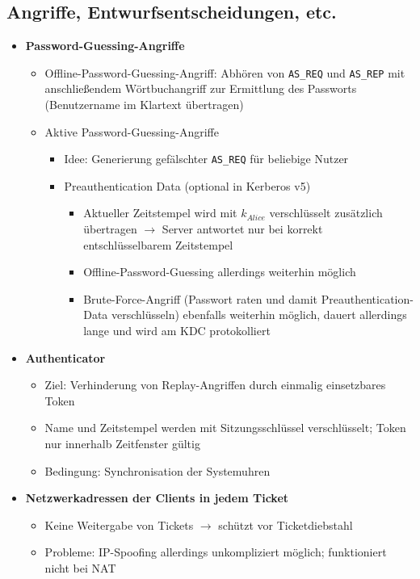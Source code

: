 \subsection{Angriffe, Entwurfsentscheidungen, etc.}
\begin{itemize}
	\item \textbf{Password-Guessing-Angriffe}
	\begin{itemize}
		\item Offline-Password-Guessing-Angriff: Abhören von \texttt{AS\_REQ} und \texttt{AS\_REP} mit anschließendem Wörtbuchangriff zur Ermittlung des Passworts (Benutzername im Klartext übertragen)
		\item Aktive Password-Guessing-Angriffe
		\begin{itemize}
			\item Idee: Generierung gefälschter \texttt{AS\_REQ} für beliebige Nutzer
			\item Preauthentication Data (optional in Kerberos v5)
			\begin{itemize}
				\item Aktueller Zeitstempel wird mit \(k_{Alice}\) verschlüsselt zusätzlich übertragen \(\rightarrow\) Server antwortet nur bei korrekt entschlüsselbarem Zeitstempel
				\item Offline-Password-Guessing allerdings weiterhin möglich
				\item Brute-Force-Angriff (Passwort raten und damit Preauthentication-Data verschlüsseln) ebenfalls weiterhin möglich, dauert allerdings lange und wird am KDC protokolliert
			\end{itemize}
		\end{itemize}
	\end{itemize}
	\item \textbf{Authenticator}
	\begin{itemize}
		\item Ziel: Verhinderung von Replay-Angriffen durch einmalig einsetzbares Token
		\item Name und Zeitstempel werden mit Sitzungsschlüssel verschlüsselt; Token nur innerhalb Zeitfenster gültig
		\item Bedingung: Synchronisation der Systemuhren
	\end{itemize}
	\item \textbf{Netzwerkadressen der Clients in jedem Ticket}
	\begin{itemize}
		\item Keine Weitergabe von Tickets \(\rightarrow\) schützt vor Ticketdiebstahl
		\item Probleme: IP-Spoofing allerdings unkompliziert möglich; funktioniert nicht bei NAT

\end{itemize}
\end{itemize}
